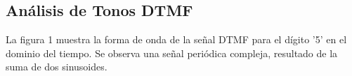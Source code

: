 \documentclass[journal]{IEEEtran} %
\begin{document}
\subsection{Análisis de Tonos DTMF}\label{AA}
La figura 1 muestra la forma de onda de la señal DTMF para el dígito '5' en el dominio del tiempo. Se observa una señal periódica compleja, resultado de la suma de dos sinusoides.









\end{document}

